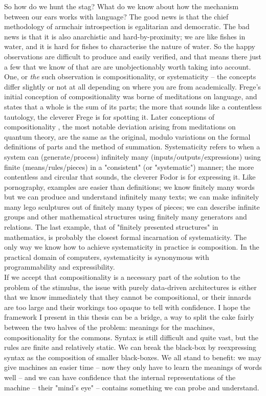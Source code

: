 So how do we hunt the stag? What do we know about how the mechanism between our ears works with language? The good news is that the chief methodology of armchair introspection is egalitarian and democratic. The bad news is that it is also anarchistic and hard-by-proximity; we are like fishes in water, and it is hard for fishes to characterise the nature of water. So the happy observations are difficult to produce and easily verified, and that means there just a few that we know of that are are unobjectionably worth taking into account. One, or \emph{the} such observation is compositionality, or systematicity -- the concepts differ slightly or not at all depending on where you are from academically. Frege's initial conception of compositionality \citep{} was borne of meditations on language, and states that a whole is the sum of its parts; the more that sounds like a contentless tautology, the cleverer Frege is for spotting it. Later conceptions of compositionality \citep{}, the most notable deviation arising from meditations on quantum theory, are the same as the original, modulo variations on the formal definitions of parts and the method of summation. Systematicity \citep{} refers to when a system can (generate/process) infinitely many (inputs/outputs/expressions) using finite (means/rules/pieces) in a "consistent" (or "systematic") manner; the more contentless and circular that sounds, the cleverer Fodor is for expressing it. Like pornography, examples are easier than definitions; we know finitely many words but we can produce and understand infinitely many texts; we can make infinitely many lego sculptures out of finitely many types of pieces; we can describe infinite groups and other mathematical structures using finitely many generators and relations. The last example, that of "finitely presented structures" in mathematics, is probably the closest formal incarnation of systematicity. The only way we know how to achieve systematicity in practice is composition. In the practical domain of computers, systematicity is synonymous with programmability and expressibility.\\

If we accept that compositionality is a necessary part of the solution to the problem of the stimulus, the issue with purely data-driven architectures is either that we know immediately that they cannot be compositional, or their innards are too large and their workings too opaque to tell with confidence. I hope the framework I present in this thesis can be a bridge, a way to split the cake fairly between the two halves of the problem: meanings for the machines, compositionality for the commons. Syntax is still difficult and quite vast, but the rules are finite and relatively static. We can break the black-box by reexpressing syntax as the composition of smaller black-boxes. We all stand to benefit: we may give machines an easier time -- now they only have to learn the meanings of words well -- and we can have confidence that the internal representations of the machine -- their "mind's eye" -- contains something we can probe and understand.

